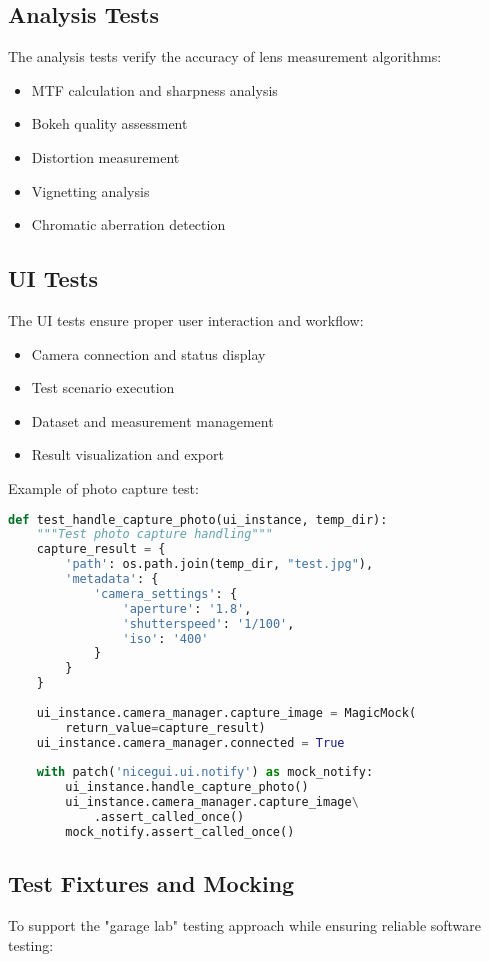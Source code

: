 \subsection{Analysis Tests}
The analysis tests verify the accuracy of lens measurement algorithms:
\begin{itemize}
    \item MTF calculation and sharpness analysis
    \item Bokeh quality assessment
    \item Distortion measurement
    \item Vignetting analysis
    \item Chromatic aberration detection
\end{itemize}

\subsection{UI Tests}
The UI tests ensure proper user interaction and workflow:
\begin{itemize}
    \item Camera connection and status display
    \item Test scenario execution
    \item Dataset and measurement management
    \item Result visualization and export
\end{itemize}

Example of photo capture test:
\begin{lstlisting}[language=Python]
def test_handle_capture_photo(ui_instance, temp_dir):
    """Test photo capture handling"""
    capture_result = {
        'path': os.path.join(temp_dir, "test.jpg"),
        'metadata': {
            'camera_settings': {
                'aperture': '1.8',
                'shutterspeed': '1/100',
                'iso': '400'
            }
        }
    }
    
    ui_instance.camera_manager.capture_image = MagicMock(
        return_value=capture_result)
    ui_instance.camera_manager.connected = True
    
    with patch('nicegui.ui.notify') as mock_notify:
        ui_instance.handle_capture_photo()
        ui_instance.camera_manager.capture_image\
            .assert_called_once()
        mock_notify.assert_called_once()
\end{lstlisting}

\subsection{Test Fixtures and Mocking}
To support the "garage lab" testing approach while ensuring reliable software testing:

